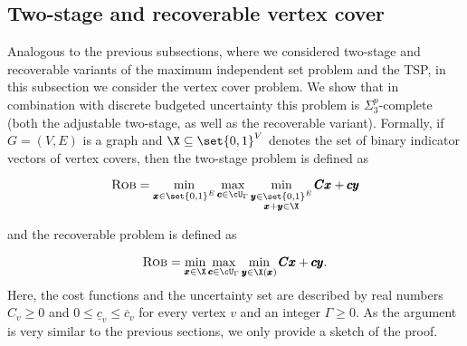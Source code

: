 \documentclass[a4paper,abstracton]{scrartcl}
\begin{document}
\subsection{Two-stage and recoverable vertex cover}
\label{subsec:vertexcover}

Analogous to the previous subsections, where we considered two-stage and recoverable variants of the maximum independent set problem and the TSP, in this subsection we consider the vertex cover problem. We show that in combination with discrete budgeted uncertainty this problem is $\Sigma_3^p$-complete (both the adjustable two-stage, as well as the recoverable variant). 
Formally, if $G = (V,E)$ is a graph and $\X \subseteq \set{0,1}^V $ denotes the set of binary indicator vectors of vertex covers, then the two-stage problem is defined as

\begin{equation*}
\textsc{Rob} = \min_{\pmb x \in \set{0,1}^E} \max_{\pmb c \in \cU_\Gamma } \min_{\substack{\pmb y \in \set{0,1}^E\\ \pmb x+ \pmb y \in \X}} \pmb C \pmb x + \pmb c \pmb y 
\end{equation*} 

and the recoverable problem is defined as

\begin{equation*}
\textsc{Rob} = \min_{\pmb x \in \X} \max_{\pmb c \in \cU_\Gamma } \min_{\pmb y \in \X(\pmb x)} \pmb C \pmb x + \pmb c \pmb y. 
\end{equation*} 
Here, the cost functions and the uncertainty set are described by real numbers $C_v \geq 0$ and  $0 \leq \underline{c}_v \leq \overline{c}_v$ for every vertex $v$ and an integer $\Gamma \geq 0$. 
As the argument is very similar to the previous sections, we only provide a sketch of the proof.
\end{document}
